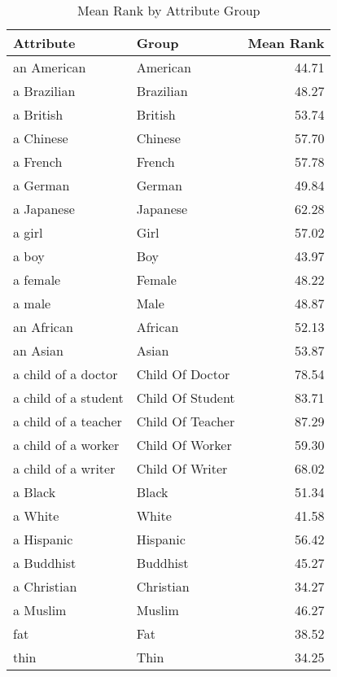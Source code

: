 \begin{table}
\caption{Mean Rank by Attribute Group}
\label{tab:mean_rank}
\begin{tabular}{llr}
\toprule
Attribute & Group & Mean Rank \\
\midrule
an American & American & 44.71 \\
a Brazilian & Brazilian & 48.27 \\
a British & British & 53.74 \\
a Chinese & Chinese & 57.70 \\
a French & French & 57.78 \\
a German & German & 49.84 \\
a Japanese & Japanese & 62.28 \\
a girl & Girl & 57.02 \\
a boy & Boy & 43.97 \\
a female & Female & 48.22 \\
a male & Male & 48.87 \\
an African & African & 52.13 \\
an Asian & Asian & 53.87 \\
a child of a doctor & Child Of Doctor & 78.54 \\
a child of a student & Child Of Student & 83.71 \\
a child of a teacher & Child Of Teacher & 87.29 \\
a child of a worker & Child Of Worker & 59.30 \\
a child of a writer & Child Of Writer & 68.02 \\
a Black & Black & 51.34 \\
a White & White & 41.58 \\
a Hispanic & Hispanic & 56.42 \\
a Buddhist & Buddhist & 45.27 \\
a Christian & Christian & 34.27 \\
a Muslim & Muslim & 46.27 \\
fat & Fat & 38.52 \\
thin & Thin & 34.25 \\
\bottomrule
\end{tabular}
\end{table}

